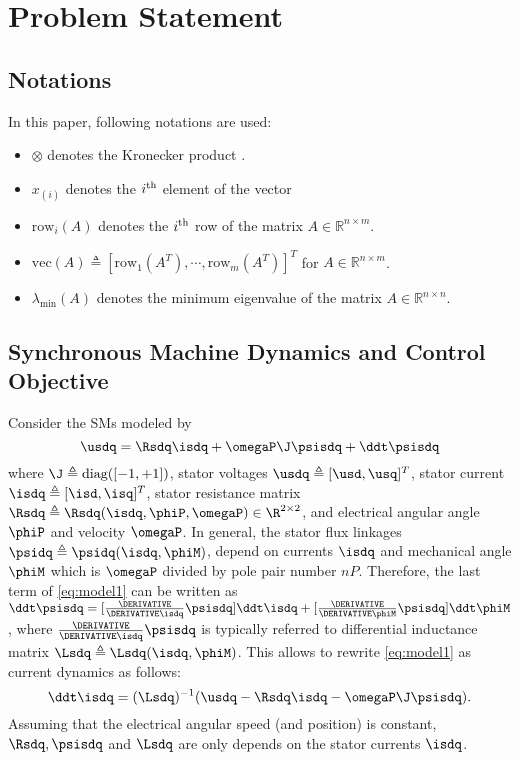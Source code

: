 \documentclass[conference]{IEEEtran}
\begin{document}
\color{blue}\lipsum[1-4]\color{black}

\section{Problem Statement}

\subsection{Notations}

In this paper, following notations are used:
\begin{itemize}
    \item $\otimes$ denotes the Kronecker product {\cite[Definition 7.1.2]{Bernstein:2009aa}}.
    \item $x_{(i)}$ denotes the $i\textsuperscript{th}$ element of the vector 
    \item $\text{row}_i(A)$ denotes the $i\textsuperscript{th}$ row of the matrix $A\in\mathbb{R}^{n\times m}$. 
    \item $\text{vec}(A)\triangleq [\text{row}_1(A^T)  ,\cdots,\text{row}_m(A^T)  ]^T   $ for $A\in\mathbb{R}^{n\times m}$.
    \item $\lambda_\text{min}(A)$ denotes the minimum eigenvalue of the matrix $A\in\mathbb{R}^{n\times n}$.
\end{itemize}

\subsection{Synchronous Machine Dynamics and Control Objective}

Consider the SMs modeled by
\begin{equation}
	\usdq = \Rsdq \isdq + \omegaP \J \psisdq+ \ddt\psisdq
	\label{eq:model1}
\end{equation}
where $\J \triangleq \text{diag}([-1,+1])$, stator voltages $\usdq \triangleq [\usd, \usq]^T$, stator current $\isdq \triangleq [\isd, \isq]^T$, stator resistance matrix $\Rsdq \triangleq \Rsdq(\isdq, \phiP, \omegaP)\in \R^{2\times2}$, and electrical angular angle $\phiP$ and velocity $\omegaP$.
In general, the stator flux linkages $\psidq \triangleq \psidq(\isdq, \phiM)$, depend on currents $\isdq$ and mechanical angle $\phiM$ which is $\omegaP$ divided by pole pair number $nP$.
Therefore, the last term of \eqref{eq:model1} can be written as $\ddt \psisdq = [{\DERIVATIVE\over \DERIVATIVE\isdq}\psisdq] \ddt \isdq + [{\DERIVATIVE\over \DERIVATIVE\phiM}\psisdq] \ddt \phiM$, where ${\DERIVATIVE\over \DERIVATIVE\isdq}\psisdq$ is typically referred to differential inductance matrix $\Lsdq\triangleq\Lsdq(\isdq, \phiM)$.
This allows to rewrite \eqref{eq:model1} as current dynamics as follows:
\begin{equation}
	\ddt \isdq = (\Lsdq)^{-1}(\usdq - \Rsdq \isdq - \omegaP \J \psisdq)
	\label{eq:model2}
	.
\end{equation}
Assuming that the electrical angular speed (and position) is constant, $\Rsdq,\psisdq$ and $\Lsdq$ are only depends on the stator currents $\isdq$.
\end{document}
